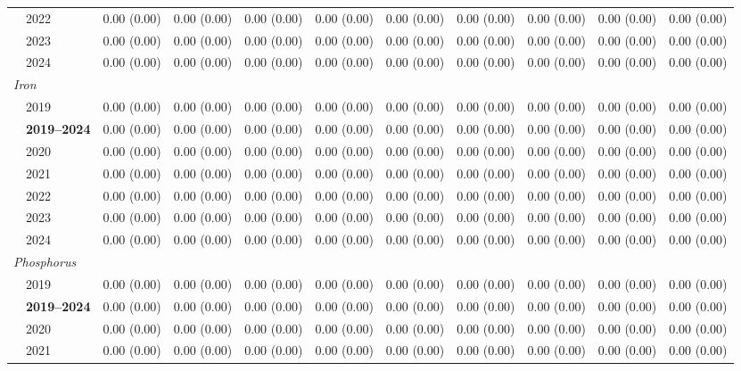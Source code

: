 \begin{table}[htbp]
\begin{tabular}{llrrrrrrrrr}
 & 2022 & 0.00 (0.00) & 0.00 (0.00) & 0.00 (0.00) & 0.00 (0.00) & 0.00 (0.00) & 0.00 (0.00) & 0.00 (0.00) & 0.00 (0.00) & 0.00 (0.00) \\
 & 2023 & 0.00 (0.00) & 0.00 (0.00) & 0.00 (0.00) & 0.00 (0.00) & 0.00 (0.00) & 0.00 (0.00) & 0.00 (0.00) & 0.00 (0.00) & 0.00 (0.00) \\
 & 2024 & 0.00 (0.00) & 0.00 (0.00) & 0.00 (0.00) & 0.00 (0.00) & 0.00 (0.00) & 0.00 (0.00) & 0.00 (0.00) & 0.00 (0.00) & 0.00 (0.00) \\
\midrule
\multicolumn{11}{l}{\textit{Iron}} \\
 & 2019 & 0.00 (0.00) & 0.00 (0.00) & 0.00 (0.00) & 0.00 (0.00) & 0.00 (0.00) & 0.00 (0.00) & 0.00 (0.00) & 0.00 (0.00) & 0.00 (0.00) \\
 & \textbf{2019–2024} & 0.00 (0.00) & 0.00 (0.00) & 0.00 (0.00) & 0.00 (0.00) & 0.00 (0.00) & 0.00 (0.00) & 0.00 (0.00) & 0.00 (0.00) & 0.00 (0.00) \\
 & 2020 & 0.00 (0.00) & 0.00 (0.00) & 0.00 (0.00) & 0.00 (0.00) & 0.00 (0.00) & 0.00 (0.00) & 0.00 (0.00) & 0.00 (0.00) & 0.00 (0.00) \\
 & 2021 & 0.00 (0.00) & 0.00 (0.00) & 0.00 (0.00) & 0.00 (0.00) & 0.00 (0.00) & 0.00 (0.00) & 0.00 (0.00) & 0.00 (0.00) & 0.00 (0.00) \\
 & 2022 & 0.00 (0.00) & 0.00 (0.00) & 0.00 (0.00) & 0.00 (0.00) & 0.00 (0.00) & 0.00 (0.00) & 0.00 (0.00) & 0.00 (0.00) & 0.00 (0.00) \\
 & 2023 & 0.00 (0.00) & 0.00 (0.00) & 0.00 (0.00) & 0.00 (0.00) & 0.00 (0.00) & 0.00 (0.00) & 0.00 (0.00) & 0.00 (0.00) & 0.00 (0.00) \\
 & 2024 & 0.00 (0.00) & 0.00 (0.00) & 0.00 (0.00) & 0.00 (0.00) & 0.00 (0.00) & 0.00 (0.00) & 0.00 (0.00) & 0.00 (0.00) & 0.00 (0.00) \\
\midrule
\multicolumn{11}{l}{\textit{Phosphorus}} \\
 & 2019 & 0.00 (0.00) & 0.00 (0.00) & 0.00 (0.00) & 0.00 (0.00) & 0.00 (0.00) & 0.00 (0.00) & 0.00 (0.00) & 0.00 (0.00) & 0.00 (0.00) \\
 & \textbf{2019–2024} & 0.00 (0.00) & 0.00 (0.00) & 0.00 (0.00) & 0.00 (0.00) & 0.00 (0.00) & 0.00 (0.00) & 0.00 (0.00) & 0.00 (0.00) & 0.00 (0.00) \\
 & 2020 & 0.00 (0.00) & 0.00 (0.00) & 0.00 (0.00) & 0.00 (0.00) & 0.00 (0.00) & 0.00 (0.00) & 0.00 (0.00) & 0.00 (0.00) & 0.00 (0.00) \\
 & 2021 & 0.00 (0.00) & 0.00 (0.00) & 0.00 (0.00) & 0.00 (0.00) & 0.00 (0.00) & 0.00 (0.00) & 0.00 (0.00) & 0.00 (0.00) & 0.00 (0.00) \\

\end{tabular}
\end{table}
